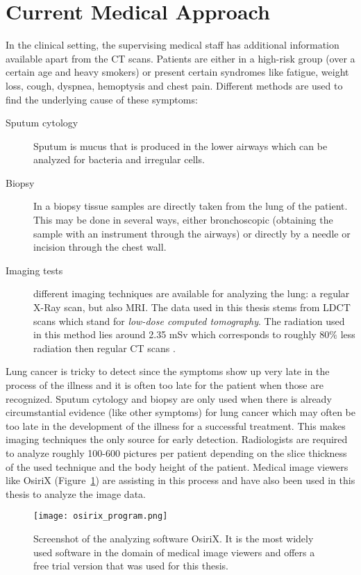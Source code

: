 \documentclass[main.tex]{subfiles}
\begin{document}
\section{Current Medical Approach}
In the clinical setting, the supervising medical staff has additional information available apart from the CT scans. Patients are either in a high-risk group (over a certain age and heavy smokers) or present certain syndromes like fatigue, weight loss, cough, dyspnea, hemoptysis and chest pain. Different methods are used to find the underlying cause of these symptoms:

\begin{description}
\item[Sputum cytology] Sputum is mucus that is produced in the lower airways which can be analyzed for bacteria and irregular cells.
\item[Biopsy] In a biopsy tissue samples are directly taken from the lung of the patient. This may be done in several ways, either bronchoscopic (obtaining the sample with an instrument through the airways) or directly by a needle or incision through the chest wall.
\item[Imaging tests] different imaging techniques are available for analyzing the lung: a regular X-Ray scan, but also MRI. The data used in this thesis stems from LDCT scans which stand for \emph{low-dose computed tomography}. The radiation used in this method lies around 2.35 mSv which corresponds to roughly 80$\%$ less radiation then regular CT scans \cite{ono2013low}.
\end{description}

Lung cancer is tricky to detect since the symptoms show up very late in the process of the illness and it is often too late for the patient when those are recognized. Sputum cytology and biopsy are only used when there is already circumstantial evidence (like other symptoms) for lung cancer which may often be too late in the development of the illness for a successful treatment. This makes imaging techniques the only source for early detection. Radiologists are required to analyze roughly 100-600 pictures per patient depending on the slice thickness of the used technique and the body height of the patient. Medical image viewers like OsiriX (Figure~\ref{fig:osirix}) are assisting in this process and have also been used in this thesis to analyze the image data.

\begin{figure}[ht]
\texttt{[image: osirix\_program.png]}
\caption{Screenshot of the analyzing software OsiriX. It is the most widely used software in the domain of medical image viewers and offers a free trial version that was used for this thesis.}
\label{fig:osirix}
\end{figure}
\end{document}
